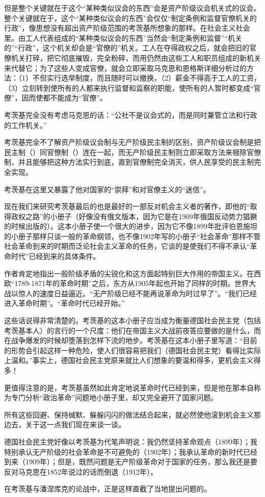 但是整个关键就在于这个“某种类似议会的东西”会是资产阶级议会机关式的议会。整个关键就在于，这个“某种类似议会的东西”会仅仅“制定条例和监督官僚机关的行政”，像思想没有超出资产阶级范围的考茨基所想象的那样。在社会主义社会里。由工人代表组成的“某种类似议会的东西”当然会“制定条例和监督”“机关的”“行政”，这个机关却会是“官僚的”机关。工人在夺得政权之后，就会把旧的官僚机关打碎，把它彻底摧毁，完全粉碎，而用仍然由这些工人和职员组成的新机关来代替它；为了这些人变成官僚，就会立即采取马克思和恩格斯详细分析过的方法：（1）不但实行选举制度，而且随时可以撤换，（2）薪金不得高于工人的工资，（3）立刻转到使{\kaishu 所有的人}都来执行监督和监察的职能，使{\kaishu 所有的人}暂时都变成“官僚”，因而使都不能成为“官僚”。

考茨基完全没有考虑马克思的话：“公社不是议会式的，而是同时兼管立法和行政的工作机关。”

考茨基完全不了解资产阶级议会制与无产阶级民主制的区别，资产阶级议会制是把民主制（）同官僚制（）连在一起，而无产阶级民主制则立即采取方法来根除官僚制，并且能够把这种方法实行到底，直到官僚制完全消灭，供人民享受的民主制完全实现。

考茨基在这里又暴露了他对国家的“崇拜”和对官僚主义的“迷信”。

现在我们来研究考茨基最后的也是最好的一部反对机会主义者的著作，即他的“取得政权之路”的小册子（好像没有俄文版本，因为它是在1909年俄国反动势力猖獗的时候出版的）。这本小册子使一个很大的进步，因为它不像1899年批评伯恩施坦的小册子那样只谈一般的革命纲领，也不像1902年写的小册子“社会革命”那样不管社会革命到来的时期而泛论社会主义革命的任务，它谈的是使我们不得不承认“革命时代”{\kaishu 已经到来}的具体条件。

作者肯定地指出一般阶级矛盾的尖锐化和这方面起特别巨大作用的帝国主义。在西欧“1789-1871年的革命时期”之后，东方从1905年起也开始了同样的时期。世界大战以惊人的速度日益逼近。“无产阶级已经不能再说革命为时过早了”。“我们已经进入革命时期”。“革命时代已经开始。”

这些话说得非常清楚的。考茨基的这本小册子应当成为衡量德国社会民主党（包括考茨基本人）的言行的一个尺度：他们在帝国主义大战前夜{\kaishu 答应要做}的是什么，而在战争爆发的时候却堕落到怎样下流的地步。考茨基在这本小册子里写道：“目前的形势会引起这样一种危险，使人们很容易把我们（德国社会民主党）看得比实际上温和。”事实上，德国社会民主党原来就比人们想象的要温和得多，更机会主义得多！

更值得注意的是，考茨基虽然如此肯定地说革命时代已经到来，但是他在那本自称为专门分析“{\kaishu 政治}革命”问题地小册子里，却又完全避开了国家问题。

所有这些回避、保持缄默、躲躲闪闪的做法结合起来，就必然使他滚到机会主义那边去，关于这一点我们现在来谈一谈。

德国社会民主党好像以考茨基为代笔声明说：我仍然坚持革命观点（1899年）；我特别承认无产阶级的社会革命是不可避免的（1902年）；我承认革命的新时代已经到来（1909年）；但是，既然问题是无产阶级革命对于国家的任务，那么我还是要反对马克思在1852年说过的话而倒退（1912年）。

在考茨基与潘涅库克的论战中，正是这样直截了当地提出问题的。











